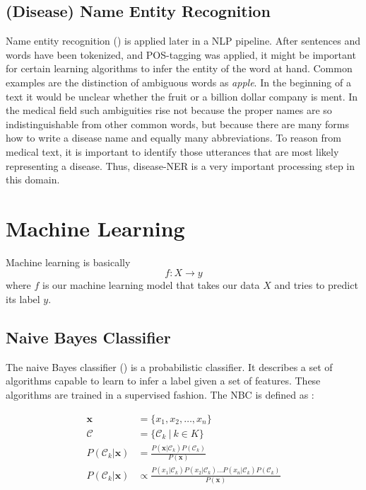 \subsection{(Disease) Name Entity Recognition}
Name entity recognition () is applied later in a NLP pipeline. After
sentences and words have been tokenized, and POS-tagging was applied, it might be important for certain learning algorithms to
infer the entity of the word at hand. Common examples are the distinction of
ambiguous words as \textit{apple}. In the beginning of a text it would be unclear whether the fruit or a billion dollar company is ment. In the medical field such ambiguities rise not because the proper names are so
indistinguishable from other common words, but because there are many forms
how to write a disease name and equally many abbreviations. To reason from medical text, it is important to identify those utterances that are most likely representing a disease. Thus, disease-NER is a very important processing step in this domain.

\section{Machine Learning}
Machine learning is basically \[f: X \rightarrow y\] where $f$ is our machine learning model that takes our data $X$ and tries to predict its label $y$.


\subsection{Naive Bayes Classifier}
The naive Bayes classifier () is a probabilistic classifier. It describes a set
of algorithms capable to learn to infer a label given a set of features. These
algorithms are trained in a supervised fashion. The NBC is defined as :

\begin{align}
  \boldsymbol{x} &= \{x_1, x_2, \dots, x_n\} \\
  \mathcal{C} &= \{\mathcal{C}_k \: | \: k \in K \} \\
  P(\mathcal{C}_k|\boldsymbol{x}) &= \frac{P(\boldsymbol{x} |\mathcal{C}_k) P(\mathcal{C}_k)} {P(\boldsymbol{x})} \\
  P(\mathcal{C}_k|\boldsymbol{x}) &\propto \frac{P(x_1 |\mathcal{C}_k)
                                       P(x_2 |\mathcal{C}_k) \dots
                                       P(x_n |\mathcal{C}_k)
                                       P(\mathcal{C}_k)}{ P(\boldsymbol{x})}
\end{align}

